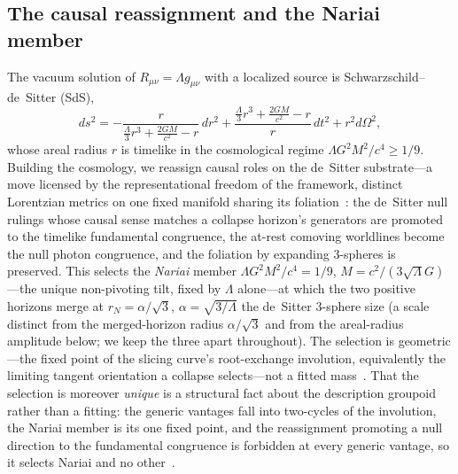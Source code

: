 \documentclass[11pt,a4paper]{article}
\theoremstyle{plain}
\theoremstyle{definition}
\theoremstyle{remark}
\begin{document}
\subsection{The causal reassignment and the Nariai member}
The vacuum solution of $R_{\mu\nu}=\Lambda g_{\mu\nu}$ with a localized source is Schwarzschild--de~Sitter (SdS),
\begin{equation}
ds^2=-\frac{r}{\frac{\Lambda}{3}r^3+\frac{2GM}{c^2}-r}\,dr^2+\frac{\frac{\Lambda}{3}r^3+\frac{2GM}{c^2}-r}{r}\,dt^2+r^2d\Omega^2,
\label{eq:sds-static}
\end{equation}
whose areal radius $r$ is timelike in the cosmological regime $\Lambda G^2M^2/c^4\ge1/9$. Building the cosmology, we reassign causal roles on the de~Sitter substrate---a move licensed by the representational freedom of the framework, distinct Lorentzian metrics on one fixed manifold sharing its foliation~\cite{JanzenCRframework}: the de~Sitter null rulings whose causal sense matches a collapse horizon's generators are promoted to the timelike fundamental congruence, the at-rest comoving worldlines become the null photon congruence, and the foliation by expanding 3-spheres is preserved. This selects the \emph{Nariai} member $\Lambda G^2M^2/c^4=1/9$, $M=c^2/(3\sqrt\Lambda G)$---the unique non-pivoting tilt, fixed by $\Lambda$ alone---at which the two positive horizons merge at $r_{N}=\alpha/\sqrt3$, $\alpha=\sqrt{3/\Lambda}$ the de~Sitter $3$-sphere size (a scale distinct from the merged-horizon radius $\alpha/\sqrt3$ and from the areal-radius amplitude below; we keep the three apart throughout). The selection is geometric---the fixed point of the slicing curve's root-exchange involution, equivalently the limiting tangent orientation a collapse selects---not a fitted mass~\cite{JanzenSlicing}. That the selection is moreover \emph{unique} is a structural fact about the description groupoid rather than a fitting: the generic vantages fall into two-cycles of the involution, the Nariai member is its one fixed point, and the reassignment promoting a null direction to the fundamental congruence is forbidden at every generic vantage, so it selects Nariai and no other~\cite{JanzenGroupoid}.
\end{document}
